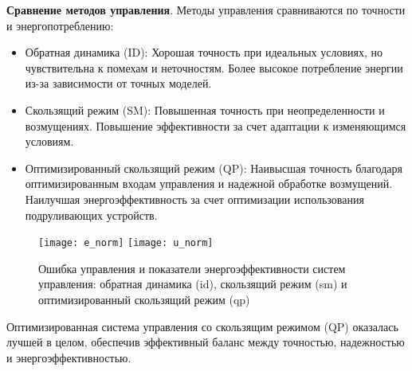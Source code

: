\textbf{Сравнение методов управления}. Методы управления сравниваются по точности и энергопотреблению:
\begin{itemize}
    \item Обратная динамика (ID): Хорошая точность при идеальных условиях, но чувствительна к помехам и неточностям. Более высокое потребление энергии из-за зависимости от точных моделей.
    \item Скользящий режим (SM): Повышенная точность при неопределенности и возмущениях. Повышение эффективности за счет адаптации к изменяющимся условиям.
    \item Оптимизированный скользящий режим (QP): Наивысшая точность благодаря оптимизированным входам управления и надежной обработке возмущений. Наилучшая энергоэффективность за счет оптимизации использования подруливающих устройств.
\end{itemize}

    \begin{figure}[h]
        \begin{center}
            \texttt{[image: e\_norm]}
            \texttt{[image: u\_norm]}
        \end{center}
        \caption{Ошибка управления и показатели энергоэффективности систем управления: обратная динамика (id), скользящий режим (sm) и оптимизированный скользящий режим (qp)}
    \end{figure}

Оптимизированная система управления со скользящим режимом (QP) оказалась лучшей в целом, обеспечив эффективный баланс между точностью, надежностью и энергоэффективностью.

